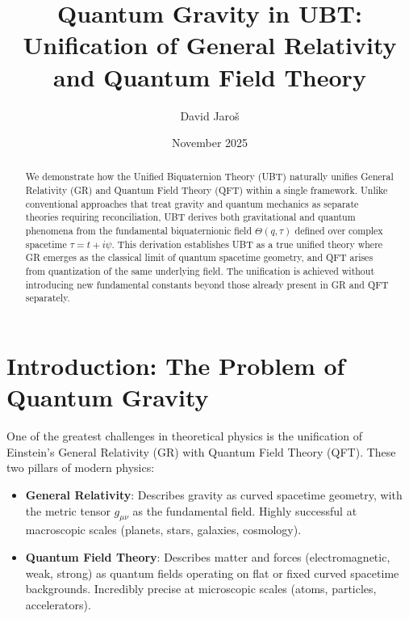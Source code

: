 \documentclass[12pt]{article}
\title{\textbf{Quantum Gravity in UBT: Unification of General Relativity and Quantum Field Theory}}
\author{David Jaroš}
\affil{\texttt{jdavid.cz@gmail.com}}
\date{November 2025}
\begin{document}
\maketitle


\SpeculativeContentWarning

\begin{abstract}
We demonstrate how the Unified Biquaternion Theory (UBT) naturally unifies General Relativity (GR) and Quantum Field Theory (QFT) within a single framework. Unlike conventional approaches that treat gravity and quantum mechanics as separate theories requiring reconciliation, UBT derives both gravitational and quantum phenomena from the fundamental biquaternionic field $\Theta(q, \tau)$ defined over complex spacetime $\tau = t + i\psi$. This derivation establishes UBT as a true unified theory where GR emerges as the classical limit of quantum spacetime geometry, and QFT arises from quantization of the same underlying field. The unification is achieved without introducing new fundamental constants beyond those already present in GR and QFT separately.
\end{abstract}

\section{Introduction: The Problem of Quantum Gravity}

One of the greatest challenges in theoretical physics is the unification of Einstein's General Relativity (GR) with Quantum Field Theory (QFT). These two pillars of modern physics:

\begin{itemize}
    \item \textbf{General Relativity}: Describes gravity as curved spacetime geometry, with the metric tensor $g_{\mu\nu}$ as the fundamental field. Highly successful at macroscopic scales (planets, stars, galaxies, cosmology).
    
    \item \textbf{Quantum Field Theory}: Describes matter and forces (electromagnetic, weak, strong) as quantum fields operating on flat or fixed curved spacetime backgrounds. Incredibly precise at microscopic scales (atoms, particles, accelerators).
\end{itemize}
\end{document}
